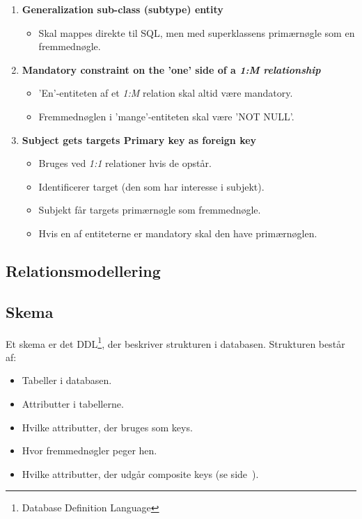 \begin{enumerate}
	\item \textbf{Generalization sub-class (subtype) entity}
	\begin{itemize}
		\item Skal mappes direkte til SQL, men med superklassens primærnøgle som en fremmednøgle.
	\end{itemize}
	
	\item \textbf{Mandatory constraint on the 'one' side of a \textit{1:M relationship}}
	\begin{itemize}
		\item 'En'-entiteten af et \textit{1:M} relation skal altid være mandatory.
		\item Fremmednøglen i 'mange'-entiteten skal være 'NOT NULL'.
	\end{itemize}
		
	\item \textbf{Subject gets targets Primary key as foreign key}
	\begin{itemize}
		\item Bruges ved \textit{1:1} relationer hvis de opstår.
		\item Identificerer target (den som har interesse i subjekt).
		\item Subjekt får targets primærnøgle som fremmednøgle.
		\item Hvis en af entiteterne er mandatory skal den have primærnøglen.
	\end{itemize}
	
\end{enumerate}

\subsection{Relationsmodellering}

\subsection{Skema}
Et skema er det DDL\footnote{Database Definition Language}, der beskriver strukturen i databasen.
Strukturen består af:

\begin{itemize}
	\item Tabeller i databasen.
	\item Attributter i tabellerne.
	\item Hvilke attributter, der bruges som keys.
	\item Hvor fremmednøgler peger hen.
	\item Hvilke attributter, der udgår composite keys (se side~\pageref{sec:keys}).
\end{itemize}






























